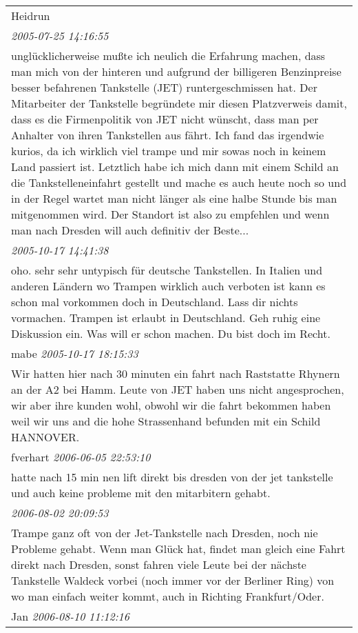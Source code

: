 \documentclass[a4paper,12pt]{article}
\begin{document}
\begin{tabular}{|p{13cm}|}
Heidrun \\
\textit{ 2005-07-25 14:16:55 }\\\hline unglücklicherweise mußte ich neulich die Erfahrung machen, dass man mich von der hinteren und aufgrund der billigeren Benzinpreise besser befahrenen Tankstelle (JET) runtergeschmissen hat. Der Mitarbeiter der Tankstelle begründete mir diesen Platzverweis damit, dass es die Firmenpolitik von JET nicht wünscht, dass man per Anhalter von ihren Tankstellen aus fährt. Ich fand das irgendwie kurios, da ich wirklich viel trampe und mir sowas noch in keinem Land passiert ist. Letztlich habe ich mich dann mit einem Schild an die Tankstelleneinfahrt gestellt und mache es auch heute noch so und in der Regel wartet man nicht länger als eine halbe Stunde bis man mitgenommen wird. Der Standort ist also zu empfehlen und wenn man nach Dresden will auch definitiv der Beste... \\
\textit{ 2005-10-17 14:41:38 }\\\hline oho. sehr sehr untypisch für deutsche Tankstellen. In Italien und anderen Ländern wo Trampen wirklich auch verboten ist kann es schon mal vorkommen doch in Deutschland. Lass dir nichts vormachen. Trampen ist erlaubt in Deutschland. Geh ruhig eine Diskussion ein. Was will er schon machen. Du bist doch im Recht. \\
mabe \textit{ 2005-10-17 18:15:33 }\\\hline Wir hatten hier nach 30 minuten ein fahrt nach Raststatte Rhynern an der A2 bei Hamm. Leute von JET haben uns nicht angesprochen, wir aber ihre kunden wohl, obwohl wir die fahrt bekommen haben weil wir uns and die hohe Strassenhand befunden mit ein Schild HANNOVER. \\
fverhart \textit{ 2006-06-05 22:53:10 }\\\hline hatte nach 15 min nen lift direkt bis dresden von der jet tankstelle und auch keine probleme mit den mitarbitern gehabt. \\
\textit{ 2006-08-02 20:09:53 }\\\hline Trampe ganz oft von der Jet-Tankstelle nach Dresden, noch nie Probleme gehabt. Wenn man Glück hat, findet man gleich eine Fahrt direkt nach Dresden, sonst fahren viele Leute bei der nächste Tankstelle Waldeck vorbei (noch immer vor der Berliner Ring) von wo man einfach weiter kommt, auch in Richting Frankfurt/Oder. \\
Jan \textit{ 2006-08-10 11:12:16 }\\\hline
\end{tabular}
\end{document}

